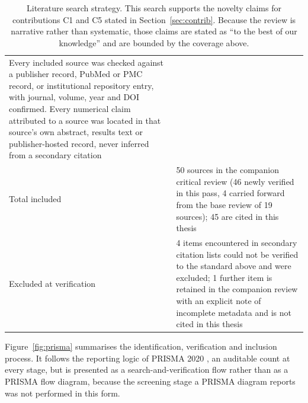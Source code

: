 \begin{table}[H]
\begin{tabular}{p{3.2cm}p{9.5cm}}
        Every included source was checked against a publisher record, PubMed or
        PMC record, or institutional repository entry, with journal, volume,
        year and DOI confirmed. Every numerical claim attributed to a source
        was located in that source's own abstract, results text or
        publisher-hosted record, never inferred from a secondary citation \\
        \addlinespace
        Total included &
        50 sources in the companion critical review (46 newly verified in this
        pass, 4 carried forward from the base review of 19 sources); 45 are
        cited in this thesis \\
        \addlinespace
        Excluded at verification &
        4 items encountered in secondary citation lists could not be verified
        to the standard above and were excluded; 1 further item is retained in
        the companion review with an explicit note of incomplete metadata and
        is not cited in this thesis \\
        \bottomrule
    \end{tabular}
    \caption{Literature search strategy. This search supports the novelty claims
    for contributions C1 and C5 stated in Section~\ref{sec:contrib}. Because the
    review is narrative rather than systematic, those claims are stated as
    ``to the best of our knowledge'' and are bounded by the coverage above.}
    \label{tab:search_strategy}
\end{table}

Figure~\ref{fig:prisma} summarises the identification, verification and
inclusion process. It follows the reporting logic of PRISMA 2020
\cite{page2021prisma}, an auditable count at every stage, but is
presented as a search-and-verification flow rather than as a PRISMA flow
diagram, because the screening stage a PRISMA diagram reports was not
performed in this form.

